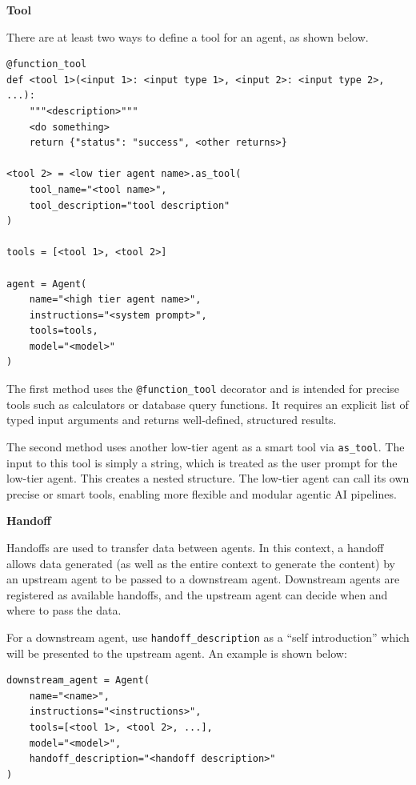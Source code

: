 \vspace{0.1in}
\noindent \textbf{Tool}
\vspace{0.1in}

There are at least two ways to define a tool for an agent, as shown below.

\begin{lstlisting}
@function_tool
def <tool 1>(<input 1>: <input type 1>, <input 2>: <input type 2>, ...):
    """<description>"""
    <do something>
    return {"status": "success", <other returns>}

<tool 2> = <low tier agent name>.as_tool(
    tool_name="<tool name>",
    tool_description="tool description"
)

tools = [<tool 1>, <tool 2>]

agent = Agent(
    name="<high tier agent name>",
    instructions="<system prompt>",
    tools=tools,
    model="<model>"
)
\end{lstlisting}

The first method uses the \verb|@function_tool| decorator and is intended for precise tools such as calculators or database query functions. It requires an explicit list of typed input arguments and returns well-defined, structured results.

The second method uses another low-tier agent as a smart tool via \verb|as_tool|. The input to this tool is simply a string, which is treated as the user prompt for the low-tier agent. This creates a nested structure. The low-tier agent can call its own precise or smart tools, enabling more flexible and modular agentic AI pipelines.

\vspace{0.1in}
\noindent \textbf{Handoff}
\vspace{0.1in}

Handoffs are used to transfer data between agents. In this context, a handoff allows data generated (as well as the entire context to generate the content) by an upstream agent to be passed to a downstream agent. Downstream agents are registered as available handoffs, and the upstream agent can decide when and where to pass the data.

For a downstream agent, use \verb|handoff_description| as a ``self introduction'' which will be presented to the upstream agent. An example is shown below:
\begin{lstlisting}
downstream_agent = Agent(
    name="<name>",
    instructions="<instructions>",
    tools=[<tool 1>, <tool 2>, ...],
    model="<model>",
    handoff_description="<handoff description>"
)
\end{lstlisting}

